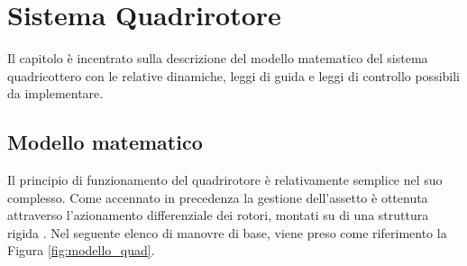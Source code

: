 \chapter{Sistema Quadrirotore}
Il capitolo è incentrato sulla descrizione del modello matematico del sistema quadricottero con le relative dinamiche, leggi di guida e leggi di controllo possibili da implementare.
\section{Modello matematico}
Il principio di funzionamento del quadrirotore è relativamente semplice nel suo complesso. Come accennato in precedenza la gestione dell'assetto è ottenuta attraverso l'azionamento differenziale dei rotori, montati su di una struttura rigida \cite{modelquad}.
Nel seguente elenco di manovre di base, viene preso come riferimento la Figura \ref{fig:modello_quad}.
